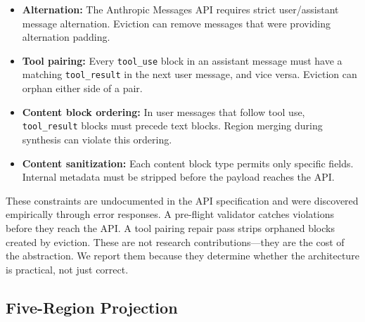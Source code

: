 \documentclass[sigplan,screen,anonymous]{acmart}
\begin{document}
\begin{itemize}
\item \textbf{Alternation:} The Anthropic Messages API requires strict
  user/assistant message alternation. Eviction can remove messages that
  were providing alternation padding.

\item \textbf{Tool pairing:} Every \texttt{tool\_use} block in an
  assistant message must have a matching \texttt{tool\_result} in the
  next user message, and vice versa. Eviction can orphan either side
  of a pair.

\item \textbf{Content block ordering:} In user messages that follow
  tool use, \texttt{tool\_result} blocks must precede text blocks.
  Region merging during synthesis can violate this ordering.

\item \textbf{Content sanitization:} Each content block type permits
  only specific fields. Internal metadata must be stripped before the
  payload reaches the API.
\end{itemize}

These constraints are undocumented in the API specification and were
discovered empirically through error responses. A pre-flight
validator catches violations before they reach the API. A tool
pairing repair pass strips orphaned blocks created by eviction. These
are not research contributions---they are the cost of the
abstraction. We report them because they determine whether the
architecture is practical, not just correct.

\subsection{Five-Region Projection}
\label{sec:regions}
\end{document}

